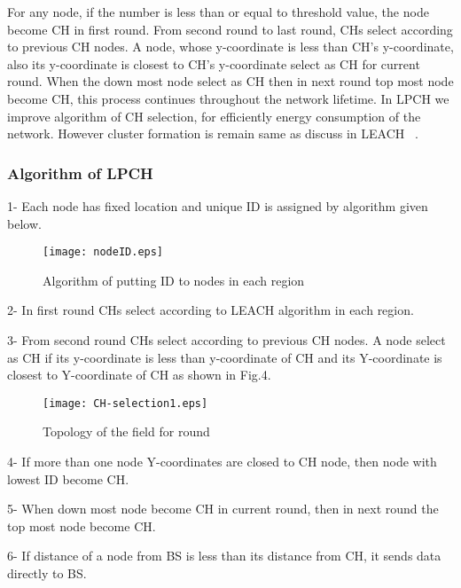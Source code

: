 \documentclass[journal]{IEEEtran}
\begin{document}
For any node, if the number is less than or equal to threshold value, the node become CH in first round. From second round to last round, CHs select according to previous CH nodes. A node, whose y-coordinate is less than CH's y-coordinate, also its y-coordinate is closest to CH's y-coordinate select as CH for current round. When the down most node select as CH then in next round top most node become CH, this process continues throughout the network lifetime. In LPCH we improve algorithm of CH selection, for efficiently energy consumption of the network. However cluster formation is remain same as discuss in LEACH ~\cite{heinzelman2000energy}.
\subsubsection{Algorithm of LPCH}
{1}- Each node has fixed location and unique ID is assigned by algorithm given below.
\begin{figure}[h]
\centering
\texttt{[image: nodeID.eps]}
\caption{Algorithm of putting ID to nodes in each region}
\end{figure}

{2}- In first round CHs select according to LEACH algorithm in each region.

{3}- From second round CHs select according to previous CH nodes. A node select as CH if its y-coordinate is less than y-coordinate of CH and its Y-coordinate is closest to Y-coordinate of CH as shown in Fig.4.
\begin{figure*}[t]
\centering
\texttt{[image: CH-selection1.eps]}
\caption{Topology of the field for  round}
\end{figure*}

{4}- If more than one node Y-coordinates are closed to CH node, then node with lowest ID become CH.

{5}- When down most node become CH in current round, then in next round the top most node become CH.

{6}- If distance of a node from BS is less than its distance from CH, it sends data directly to BS.
\end{document}
